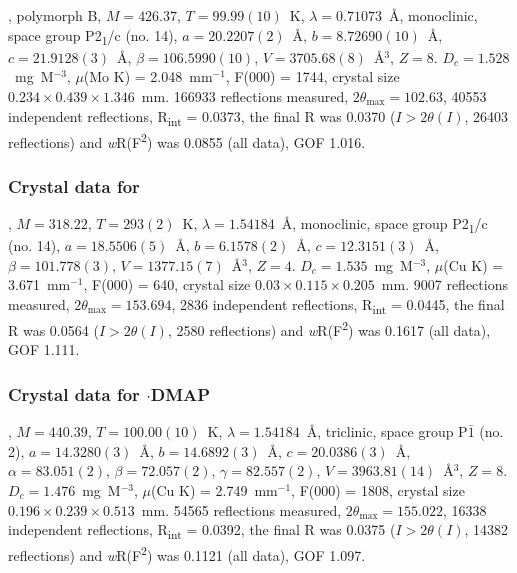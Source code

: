 \begin{refsection}
, polymorph B, $M=426.37$, $T=99.99(10)$~K, $\lambda=0.71073$~\AA, monoclinic, space group P2\textsubscript{1}/c (no. 14), $a = 20.2207(2)$~\AA, $b = 8.72690(10)$~\AA, $c = 21.9128(3)$~\AA, $\beta = 106.5990(10)$\degree, $V = 3705.68(8)$~\AA$^{3}$, $Z = 8$. $D_{c}= 1.528$~mg~M$^{-3}$, $\mu$(Mo K\a) = 2.048~mm$^{-1}$, F(000) = 1744, crystal size $0.234 \times 0.439 \times 1.346$~mm. 166933 reflections measured, $2\theta_{\mathrm{max}}=102.63$\degree, 40553 independent reflections, R\textsubscript{int} = 0.0373, the final R was 0.0370 ($I > 2\theta(I)$, 26403 reflections) and \emph{w}R(F\textsuperscript{2}) was 0.0855 (all data), GOF 1.016.

\subsubsection{Crystal data for \texorpdfstring{}{C15 H13 N O2 Se}}
, $M=318.22$, $T=293(2)$~K, $\lambda=1.54184$~\AA, monoclinic, space group P2\textsubscript{1}/c (no. 14), $a = 18.5506(5)$~\AA, $b = 6.1578(2)$~\AA, $c = 12.3151(3)$~\AA, $\beta = 101.778(3)$\degree, $V = 1377.15(7)$~\AA$^{3}$, $Z = 4$. $D_{c}= 1.535$~mg~M$^{-3}$, $\mu$(Cu K\a) = 3.671~mm$^{-1}$, F(000) = 640, crystal size $0.03 \times 0.115 \times 0.205$~mm. 9007 reflections measured, $2\theta_{\mathrm{max}}=153.694$\degree, 2836 independent reflections, R\textsubscript{int} = 0.0445, the final R was 0.0564 ($I > 2\theta(I)$, 2580 reflections) and \emph{w}R(F\textsuperscript{2}) was 0.1617 (all data), GOF 1.111.

\subsubsection{Crystal data for \texorpdfstring{$\cdot$DMAP}{C22 H23 N3 O2 Se}}
, $M=440.39$, $T=100.00(10)$~K, $\lambda=1.54184$~\AA, triclinic, space group P$\bar{1}$ (no. 2), $a = 14.3280(3)$~\AA, $b = 14.6892(3)$~\AA, $c = 20.0386(3)$~\AA, $\alpha = 83.051(2)$\degree, $\beta = 72.057(2)$\degree, $\gamma = 82.557(2)$\degree, $V = 3963.81(14)$~\AA$^{3}$, $Z = 8$. $D_{c}= 1.476$~mg~M$^{-3}$, $\mu$(Cu K\a) = 2.749~mm$^{-1}$, F(000) = 1808, crystal size $0.196 \times 0.239 \times 0.513$~mm. 54565 reflections measured, $2\theta_{\mathrm{max}}=155.022$\degree, 16338 independent reflections, R\textsubscript{int} = 0.0392, the final R was 0.0375 ($I > 2\theta(I)$, 14382 reflections) and \emph{w}R(F\textsuperscript{2}) was 0.1121 (all data), GOF 1.097.


\end{refsection}
